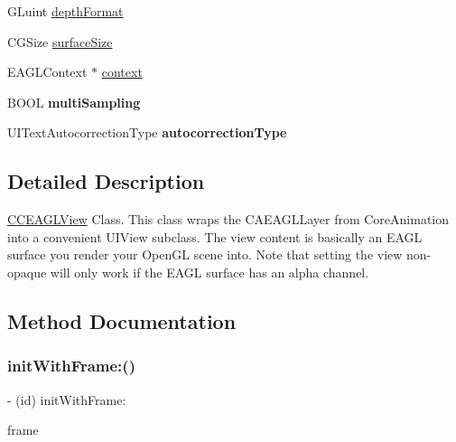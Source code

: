 \begin{DoxyCompactItemize}
G\+Luint \hyperlink{interfaceCCEAGLView_a01c8d2218db6f275e4f56859062bd6ce}{depth\+Format}
\item 
C\+G\+Size \hyperlink{interfaceCCEAGLView_ab3814c5eab706bc503615ee0a7de097c}{surface\+Size}
\item 
E\+A\+G\+L\+Context $\ast$ \hyperlink{interfaceCCEAGLView_ab45ef8d7ee501ddf5ac4e1ab7a8d3400}{context}
\item 
\mbox{\label{interfaceCCEAGLView_aa471ade1ad8a6c1002d2399119d4a00b}} 
B\+O\+OL {\bfseries multi\+Sampling}
\item 
\mbox{\label{interfaceCCEAGLView_a85a26965b66629e2ec180e93d24774ef}} 
U\+I\+Text\+Autocorrection\+Type {\bfseries autocorrection\+Type}
\end{DoxyCompactItemize}


\subsection{Detailed Description}
\hyperlink{interfaceCCEAGLView}{C\+C\+E\+A\+G\+L\+View} Class. This class wraps the C\+A\+E\+A\+G\+L\+Layer from Core\+Animation into a convenient U\+I\+View subclass. The view content is basically an E\+A\+GL surface you render your Open\+GL scene into. Note that setting the view non-\/opaque will only work if the E\+A\+GL surface has an alpha channel. 

\subsection{Method Documentation}
\mbox{\label{interfaceCCEAGLView_a7d569f8fad8006eaa02d9b60f3877e43}} 
\subsubsection{\texorpdfstring{init\+With\+Frame\+:()}{initWithFrame:()}\hspace{0.1cm}{\footnotesize\ttfamily [1/2]}}
{\footnotesize\ttfamily -\/ (id) init\+With\+Frame\+: \begin{DoxyParamCaption}\item[{(C\+G\+Rect)}]{frame }\end{DoxyParamCaption}}

